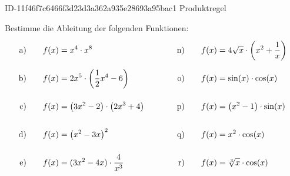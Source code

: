 \begin{exercise}
      {ID-11f46f7c6466f3d23d3a362a935e28693a95bac1}
      {Produktregel}
  \ifproblem\problem\par
    Bestimme die Ableitung der folgenden Funktionen:
    \begingroup
      \newcommand{\vstrut}{\rule[-3ex]{0pt}{7ex}}%
      \newcommand{\xca}{f(x)&=x^{4}\cdot x^{8}}%
      \newcommand{\xcb}{f(x)&=2x^{5}\cdot\left(\frac{1}{2}x^{4}-6\right)}%
      \newcommand{\xcc}{f(x)&=\left(3x^{2}-2\right)\cdot\left(2x^{3}+4\right)}%
      \newcommand{\xcd}{f(x)&=\left(x^{2}-3x\right)^{2}}%
      \newcommand{\xce}{f(x)&=(3x^{2}-4x)\cdot\frac{4}{x^{3}}}%
      \newcommand{\xcf}{f(x)&=\left(ax^{2}+3\right)\cdot\left(x^{2}-a\right)}%
      \newcommand{\xcg}{f(x)&=(x-t)\cdot\left(x^{2}+t^{2}\right)}%
      \newcommand{\xch}{f(t)&=\left(t^{2}+a^{2}\right)\cdot\left(at^{3}-a\right)}%
      \newcommand{\xci}{f(x)&=\left(7x-1\right)^{4}\cdot x^{-2}}%
      \newcommand{\xcj}{f(x)&=\left(x-1\right)\cdot\left(x^{2}+x+7\right)}%
      \newcommand{\xck}{f(x)&=(3x^{2}+x)\cdot(13x-9x^{2})}%
      \newcommand{\xcl}{f(x)&=\frac{1}{x}\cdot\left(x^{2}-4\right)}%
      \newcommand{\xcm}{f(x)&=x^{2}\cdot\sqrt{x}}%
      \newcommand{\xcn}{f(x)&=4\sqrt{x}\cdot\left(x^{2}+\frac{1}{x}\right)}%
      \newcommand{\xco}{f(x)&=\sin(x)\cdot\cos(x)}%
      \newcommand{\xcp}{f(x)&=\left(x^{2}-1\right)\cdot\sin(x)}%
      \newcommand{\xcq}{f(x)&=x^{2}\cdot\cos(x)}%
      \newcommand{\xcr}{f(x)&=\sqrt[3]{x}\cdot\cos(x)}%
      \newcommand{\xcs}{f(x)&=x^{2}\cdot e^{x}}%
      \newcommand{\xct}{f(x)&=(2x+4)\cdot e^{-2x}}%
      \newcommand{\xcu}{f(x)&=3axe^{x}}%
      \newcommand{\xcv}{f(x)&=e^{x}\cdot\sin(x)}%
      \newcommand{\xcw}{f(x)&=\left(x^{3}+e^{x}+1\right)\cdot\cos(x)}%
      \newcommand{\xcx}{f(x)&=x^{3}\cdot3^{x}}%
      \newcommand{\xcy}{f(x)&=x\cdot(\ln(x)-1)}%
      \newcommand{\xcz}{f(x)&=-5x^{2}\cdot\ln(x)}%
      \allowdisplaybreaks
      \begin{alignat*}{5}
        \text{a)\vstrut}&\quad & \xca & \quad&\quad & \text{n)\vstrut}&\quad & \xcn \\
        \text{b)\vstrut}&\quad & \xcb & \quad&\quad & \text{o)\vstrut}&\quad & \xco \\
        \text{c)\vstrut}&\quad & \xcc & \quad&\quad & \text{p)\vstrut}&\quad & \xcp \\
        \text{d)\vstrut}&\quad & \xcd & \quad&\quad & \text{q)\vstrut}&\quad & \xcq \\
        \text{e)\vstrut}&\quad & \xce & \quad&\quad & \text{r)\vstrut}&\quad & \xcr \\

\end{alignat*}
\end{exercise}
